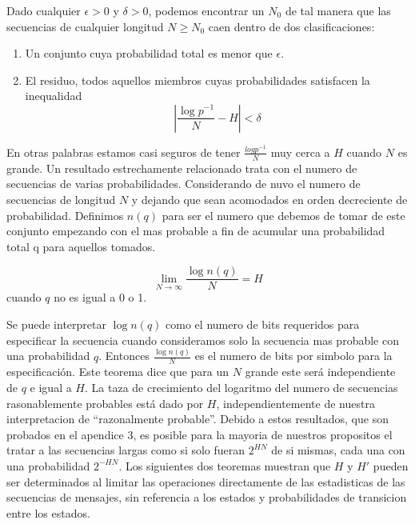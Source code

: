 \begin{theorem}
\label{th:3}
Dado cualquier $\epsilon > 0$ y $\delta > 0$, podemos encontrar un
$N_{0}$ de tal manera que las secuencias de cualquier longitud $N \geq
N_{0}$ caen dentro de dos clasificaciones:
\begin{enumerate}
\item Un conjunto cuya probabilidad total es menor que $\epsilon$.
\item El residuo, todos aquellos miembros cuyas probabilidades satisfacen la inequalidad
\begin{equation}
|\frac{\log p^{-1}}{N} - H| < \delta
\end{equation}
\end{enumerate}
\end{theorem}

En otras palabras estamos casi seguros de tener $\frac{log p^{-1}}{N}$
muy cerca a $H$ cuando $N$ es grande.  Un resultado estrechamente
relacionado trata con el numero de secuencias de varias
probabilidades. Considerando de nuvo el numero de secuencias de
longitud $N$ y dejando que sean acomodados en orden decreciente de
probabilidad. Definimos $n(q)$ para ser el numero que debemos de tomar
de este conjunto empezando con el mas probable a fin de acumular una
probabilidad total q para aquellos tomados.

\begin{theorem}
\label{th:4}
\begin{equation}
\lim_{N \rightarrow \infty} \frac{\log n(q)}{N} = H
\end{equation}
cuando $q$ no es igual a 0 o 1.
\end{theorem}

Se puede interpretar $\log n(q)$ como el numero de bits requeridos
para especificar la secuencia cuando consideramos solo la secuencia
mas probable con una probabilidad $q$. Entonces $\frac{\log n(q)}{N}$
es el numero de bits por simbolo para la especificaci\'{o}n. Este
teorema dice que para un $N$ grande este ser\'{a} independiente de $q$
e igual a $H$. La taza de crecimiento del logaritmo del numero de
secuencias rasonablemente probables est\'{a} dado por $H$,
independientemente de nuestra interpretacion de ``razonalmente
probable''. Debido a estos resultados, que son probados en el apendice
3, es posible para la mayoria de nuestros propositos el tratar a las
secuencias largas como si solo fueran $2^{HN}$ de si mismas, cada una
con una probabilidad $2^{-HN}$.  Los siguientes dos teoremas muestran
que $H$ y $H'$ pueden ser determinados al limitar las operaciones
directamente de las estadisticas de las secuencias de mensajes, sin
referencia a los estados y probabilidades de transicion entre los
estados.

